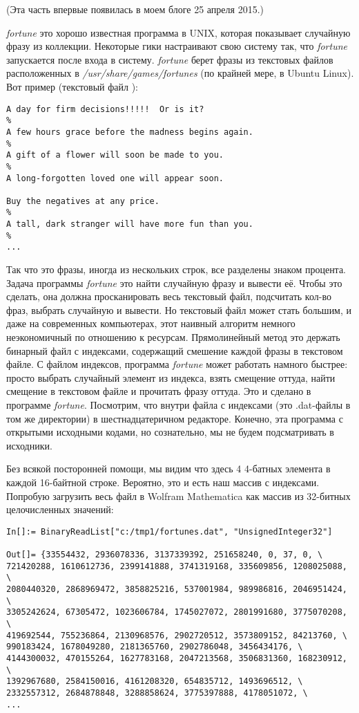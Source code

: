 
(Эта часть впервые появилась в моем блоге 25 апреля 2015.)

\emph{fortune} это хорошо известная программа в UNIX, которая показывает случайную фразу из коллекции.
Некоторые гики настраивают свою систему так, что \emph{fortune} запускается после входа в систему.
\emph{fortune} берет фразы из текстовых файлов расположенных в \emph{/usr/share/games/fortunes} (по крайней мере, в Ubuntu Linux).
Вот пример (текстовый файл ):

\begin{lstlisting}
A day for firm decisions!!!!!  Or is it?
%
A few hours grace before the madness begins again.
%
A gift of a flower will soon be made to you.
%
A long-forgotten loved one will appear soon.

Buy the negatives at any price.
%
A tall, dark stranger will have more fun than you.
%
...
\end{lstlisting}

Так что это фразы, иногда из нескольких строк, все разделены знаком процента.
Задача программы \emph{fortune} это найти случайную фразу и вывести её.
Чтобы это сделать, она должна просканировать весь текстовый файл, подсчитать кол-во фраз, выбрать случайную и вывести.
Но текстовый файл может стать большим, и даже на современных компьютерах, этот наивный алгоритм немного неэкономичный
по отношению к ресурсам.
Прямолинейный метод это держать бинарный файл с индексами, содержащий смешение каждой фразы в текстовом файле.
С файлом индексов, программа \emph{fortune} может работать намного быстрее: просто выбрать случайный элемент из индекса,
взять смещение оттуда, найти смещение в текстовом файле и прочитать фразу оттуда.
Это и сделано в программе \emph{fortune}.
Посмотрим, что внутри файла с индексами (это .dat-файлы в том же директории) в шестнадцатеричном редакторе.
Конечно, эта программа с открытыми исходными кодами, но сознательно, мы не будем подсматривать в исходники.



Без всякой посторонней помощи, мы видим что здесь 4 4-батных элемента в каждой 16-байтной строке.
Вероятно, это и есть наш массив с индексами.
Попробую загрузить весь файл в Wolfram Mathematica как массив из 32-битных целочисленных значений:

\begin{lstlisting}[style=custommath]
In[]:= BinaryReadList["c:/tmp1/fortunes.dat", "UnsignedInteger32"]

Out[]= {33554432, 2936078336, 3137339392, 251658240, 0, 37, 0, \
721420288, 1610612736, 2399141888, 3741319168, 335609856, 1208025088, \
2080440320, 2868969472, 3858825216, 537001984, 989986816, 2046951424, \
3305242624, 67305472, 1023606784, 1745027072, 2801991680, 3775070208, \
419692544, 755236864, 2130968576, 2902720512, 3573809152, 84213760, \
990183424, 1678049280, 2181365760, 2902786048, 3456434176, \
4144300032, 470155264, 1627783168, 2047213568, 3506831360, 168230912, \
1392967680, 2584150016, 4161208320, 654835712, 1493696512, \
2332557312, 2684878848, 3288858624, 3775397888, 4178051072, \
...
\end{lstlisting}

